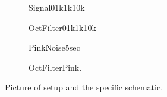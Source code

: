 \begin{figure}[H]
	\centering
	\begin{subfigure}[b]{0.45\textwidth}
		\centering
			
		\caption{Signal01k1k10k}
		\label{fig:Signal01k1k10k}
	\end{subfigure}
	\hfill
	\begin{subfigure}[b]{0.45\textwidth}
		\centering
			
		\caption{OctFilter01k1k10k}
		\label{fig:OctFilter01k1k10k}
	\end{subfigure}	
	\begin{subfigure}[b]{0.45\textwidth}
		\centering
			
		\caption{PinkNoise5sec}
		\label{fig:PinkNoise5sec}
	\end{subfigure}	
	\hfill
	\begin{subfigure}[b]{0.45\textwidth}
		\centering
		
		\caption{OctFilterPink.}
		\label{fig:OctFilterPink}
	\end{subfigure}	

	\caption{Picture of setup and the specific schematic.}
\end{figure}




